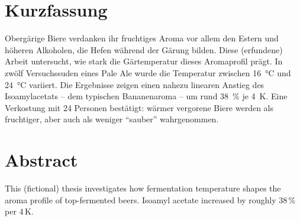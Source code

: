 \chapter*{Kurzfassung}

Obergärige Biere verdanken ihr fruchtiges Aroma vor allem den Estern und höheren
Alkoholen, die Hefen während der Gärung bilden. Diese (erfundene) Arbeit untersucht,
wie stark die Gärtemperatur dieses Aromaprofil prägt. In zwölf Versuchssuden eines
Pale Ale wurde die Temperatur zwischen \SI{16}{\celsius} und \SI{24}{\celsius}
variiert. Die Ergebnisse zeigen einen nahezu linearen Anstieg des Isoamylacetats
-- dem typischen Bananenaroma -- um rund \SI{38}{\percent} je \SI{4}{\kelvin}.
Eine Verkostung mit 24 Personen bestätigt: wärmer vergorene Biere werden als
fruchtiger, aber auch als weniger \enquote{sauber} wahrgenommen.

\chapter*{Abstract}

This (fictional) thesis investigates how fermentation temperature shapes the aroma
profile of top-fermented beers. Isoamyl acetate increased by roughly 38\,\% per 4\,K.
